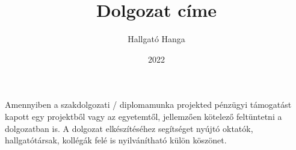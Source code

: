 \documentclass[
]{elteikthesis}[2022/04/30]
\title{Dolgozat címe} %
\date{2022} %
\author{Hallgató Hanga}
\affiliation{egyetemi tanársegéd} %
\begin{document}


\maketitle
\topicdeclaration

\tableofcontents
\cleardoublepage


\cleardoublepage


\cleardoublepage


\cleardoublepage


\cleardoublepage

\chapter*{\acklabel}
Amennyiben a szakdolgozati / diplomamunka projekted pénzügyi támogatást kapott egy projektből vagy az egyetemtől, jellemzően kötelező feltüntetni a dolgozatban is. A dolgozat elkészítéséhez segítséget nyújtó oktatók, hallgatótársak, kollégák felé is nyilvánítható külön köszönet.

\appendix

\cleardoublepage

{}
\printbibliography[title=\biblabel]
\cleardoublepage

{}
\listoffigures
\cleardoublepage

{}
\listoftables
\cleardoublepage

{}
\listofalgorithms
\cleardoublepage

{}
\lstlistoflistings
\cleardoublepage

\end{document}
